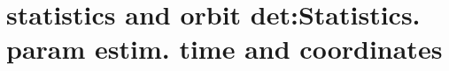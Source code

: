 \section{ statistics and orbit det:Statistics. param estim. time and coordinates }\label{sec:q1}    
